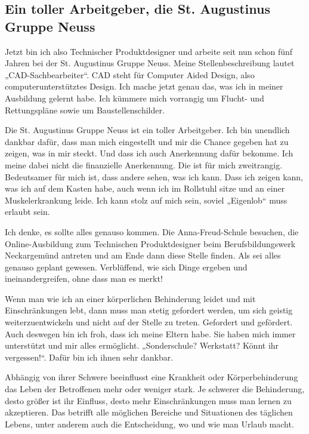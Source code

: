 \documentclass[fontsize=14pt,a4paper,headinclude,DIV=calc,automark]{scrbook}
\begin{document}
\subsection{Ein toller Arbeitgeber, die St. Augustinus Gruppe Neuss}

Jetzt bin ich also Technischer Produktdesigner und arbeite seit nun schon fünf Jahren bei der St. Augustinus Gruppe Neuss. Meine Stellenbeschreibung lautet „CAD-Sachbearbeiter“. CAD steht für Computer Aided Design, also computerunterstütztes Design. Ich mache jetzt genau das, was ich in meiner Ausbildung gelernt habe. Ich kümmere mich vorrangig um Flucht- und Rettungspläne sowie um Baustellenschilder.

Die St. Augustinus Gruppe Neuss ist ein toller Arbeitgeber. Ich bin unendlich dankbar dafür, dass man mich eingestellt und mir die Chance gegeben hat zu zeigen, was in mir steckt. Und dass ich auch Anerkennung dafür bekomme. Ich meine dabei nicht die finanzielle Anerkennung. Die ist für mich zweitrangig. Bedeutsamer für mich ist, dass andere sehen, was ich kann. Dass ich zeigen kann, was ich auf dem Kasten habe, auch wenn ich im Rollstuhl sitze und an einer Muskelerkrankung leide. Ich kann stolz auf mich sein, soviel „Eigenlob“ muss erlaubt sein.

Ich denke, es sollte alles genauso kommen. Die Anna-Freud-Schule besuchen, die Online-Ausbildung zum Technischen Produktdesigner beim Be\-rufs\-bil­d\-ungs\-werk Neckargemünd antreten und am Ende dann diese Stelle finden. Als sei alles genauso geplant gewesen. Verblüffend, wie sich Dinge ergeben und ineinandergreifen, ohne dass man es merkt!

Wenn man wie ich an einer körperlichen Behinderung leidet und mit Einschränkungen lebt, dann muss man stetig gefordert werden, um sich geistig weiterzuentwickeln und nicht auf der Stelle zu treten. Gefordert und gefördert. Auch deswegen bin ich froh, dass ich meine Eltern habe. Sie haben mich immer unterstützt und mir alles ermöglicht. „Sonderschule? Werkstatt? Könnt ihr vergessen!“. Dafür bin ich ihnen sehr dankbar.

\thispagestyle{scrheadings} %

\leavevmode
\normalsize

Abhängig von ihrer Schwere beeinflusst eine Krankheit oder Körperbehinderung das Leben der Betroffenen mehr oder weniger stark. Je schwerer die Behinderung, desto größer ist ihr Einfluss, desto mehr Einschränkungen muss man lernen zu akzeptieren. Das betrifft alle möglichen Bereiche und Situationen des täglichen Lebens, unter anderem auch die Entscheidung, wo und wie man Urlaub macht.
\end{document}
